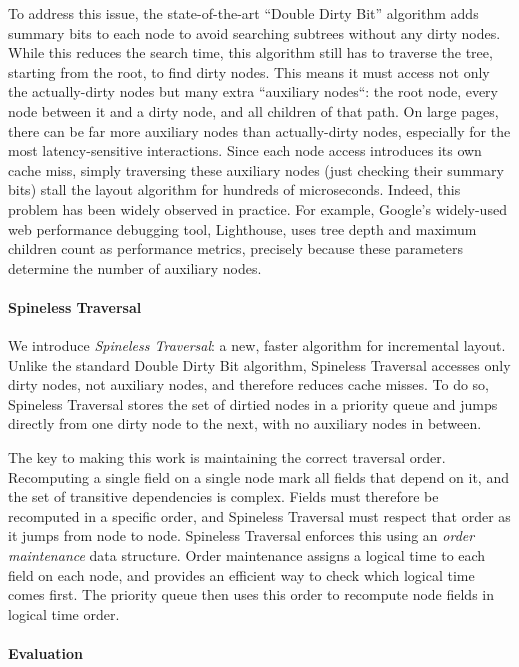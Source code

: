 To address this issue,
  the state-of-the-art ``Double Dirty Bit'' algorithm
  adds summary bits to each node
  to avoid searching subtrees without any dirty nodes.
While this reduces the search time,
  this algorithm still has to traverse the tree,
  starting from the root, to find dirty nodes.
This means it must access not only the actually-dirty nodes
  but many extra ``auxiliary nodes``:
  the root node, every node between it and a dirty node,
  and all children of that path.
On large pages, there can be far more auxiliary nodes
  than actually-dirty nodes,
  especially for the most latency-sensitive interactions.
Since each node access introduces its own cache miss,
  simply traversing these auxiliary nodes
  (just checking their summary bits)
  stall the layout algorithm for hundreds of microseconds.
Indeed, this problem has been widely observed in practice.
For example,
  Google's widely-used web performance debugging tool, Lighthouse,
  uses tree depth and maximum children count as performance metrics,
  precisely because these parameters
  determine the number of auxiliary nodes.

\paragraph{Spineless Traversal}

We introduce \textit{Spineless Traversal}:
  a new, faster algorithm for incremental layout.
Unlike the standard Double Dirty Bit algorithm,
  Spineless Traversal accesses only dirty nodes, not auxiliary nodes,
  and therefore reduces cache misses.
To do so, Spineless Traversal
  stores the set of dirtied nodes in a priority queue
  and jumps directly from one dirty node to the next,
  with no auxiliary nodes in between.

The key to making this work is maintaining the correct traversal order. 
Recomputing a single field on a single node mark all fields that depend on it,
  and the set of transitive dependencies is complex.
Fields must therefore be recomputed in a specific order,
  and Spineless Traversal must respect that order
  as it jumps from node to node.
Spineless Traversal enforces this
  using an \emph{order maintenance} data structure.
Order maintenance assigns a logical time to each field on each node,
  and provides an efficient way to check which logical time comes first.
The priority queue then uses this order
  to recompute node fields in logical time order.

\paragraph{Evaluation}

